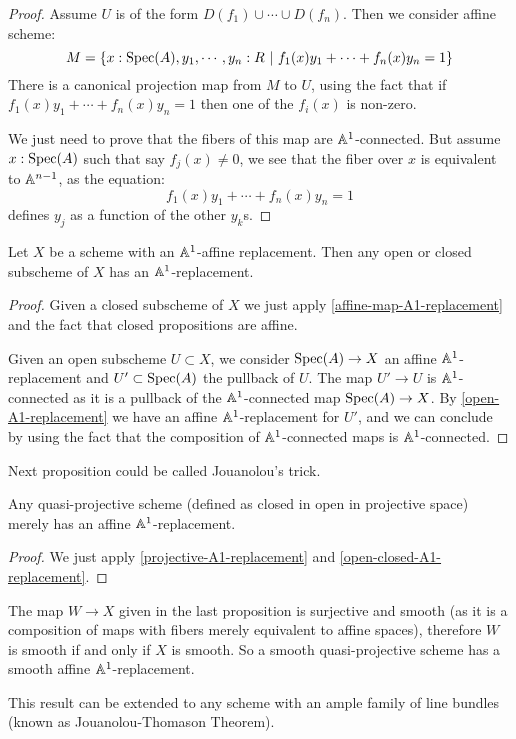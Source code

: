 \begin{proof}
Assume $U$ is of the form $D(f_1)\cup \cdots \cup D(f_n)$. Then we consider affine scheme:
\[M = \{x:\operatorname{Spec}(A),y_1,\cdots, y_n:R\ |\ f_1(x)y_1 + \cdots + f_n(x)y_n = 1\}\]
There is a canonical projection map from $M$ to $U$, using the fact that if $f_1(x)y_1 + \cdots + f_n(x)y_n = 1$ then one of the $f_i(x)$ is non-zero.

We just need to prove that the fibers of this map are $\mathbb{A}^1$-connected. But assume $x:\operatorname{Spec}(A)$ such that say $f_j(x)\not=0$, we see that the fiber over $x$ is equivalent to $\mathbb{A}^{n-1}$, as the equation:
\[f_1(x)y_1 + \cdots + f_n(x)y_n = 1\]
defines $y_j$ as a function of the other $y_k$s.
\end{proof}

\begin{proposition}\label{open-closed-A1-replacement}
Let $X$ be a scheme with an $\mathbb{A}^1$-affine replacement. Then any open or closed subscheme of $X$ has an $\mathbb{A}^1$-replacement.
\end{proposition}

\begin{proof}
Given a closed subscheme of $X$ we just apply \cref{affine-map-A1-replacement} and the fact that closed propositions are affine.

Given an open subscheme $U\subset X$, we consider $\operatorname{Spec}(A)\to X$ an affine $\mathbb{A}^1$-replacement and $U'\subset \operatorname{Spec}(A)$ the pullback of $U$. The map $U'\to U$ is $\mathbb{A}^1$-connected as it is a pullback of the $\mathbb{A}^1$-connected map $\operatorname{Spec}(A)\to X$. By \cref{open-A1-replacement} we have an affine $\mathbb{A}^1$-replacement for $U'$, and we can conclude by using the fact that the composition of $\mathbb{A}^1$-connected maps is $\mathbb{A}^1$-connected.
\end{proof}

Next proposition could be called Jouanolou's trick.

\begin{proposition}
Any quasi-projective scheme (defined as closed in open in projective space) merely has an affine $\mathbb{A}^1$-replacement.
\end{proposition}

\begin{proof}
We just apply \cref{projective-A1-replacement} and \cref{open-closed-A1-replacement}.
\end{proof}

\begin{remark}
The map $W\to X$ given in the last proposition is surjective and smooth (as it is a composition of maps with fibers merely equivalent to affine spaces), therefore $W$ is smooth if and only if $X$ is smooth. So a smooth quasi-projective scheme has a smooth affine $\mathbb{A}^1$-replacement.
\end{remark}

\begin{remark}
This result can be extended to any scheme with an ample family of line bundles (known as Jouanolou-Thomason Theorem).
\end{remark}


